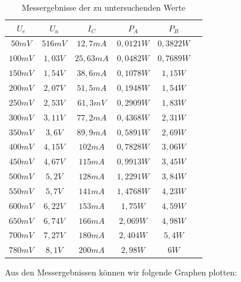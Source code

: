 \documentclass{article}
\begin{document}
\begin{table}[h]
  \centering
  \begin{tabular}{|c|c|c|c|c|c|}
    $U_{e}$& $U_{a}$ & $I_{C}$&$P_{A}$&$P_{B}$\\
    \hline
    $50mV$ & $516mV$ & $12,7mA$ & $0,0121W$ & $0,3822W$\\
    \hline
    $100mV$ & $1,03V$ & $25,63mA$ & $0,0482W$ & $0,7689W$\\
    \hline
    $150mV$ & $1,54V$ & $38,6mA$ & $0,1078W$ & $1,15W$\\
    \hline
    $200mV$ & $2,07V$ & $51,5mA$ & $0,1948W$ & $1,54W$\\
    \hline
    $250mV$ & $2,53V$ & $61,3mV$ & $0,2909W$ & $1,83W$\\
    \hline
    $300mV$ & $3,11V$ & $77,2mA$ & $0,4368W$ & $2,31W$\\
    \hline
    $350mV$ & $3,6V$ & $89,9mA$ & $0,5891W$ & $2,69W$\\
    \hline
    $400mV$ & $4,15V$ & $102mA$ & $0,7828W$ & $3,06W$\\
    \hline
    $450mV$& $4,67V$ & $115mA$ & $0,9913W$ & $3,45W$\\
    \hline
    $500mV$ & $5,2V$ & $128mA$ & $1,2291W$ & $3,84W$\\
    \hline
    $550mV$ & $5,7V$ & $141mA$ & $1,4768W$ & $4,23W$\\
    \hline
    $600mV$ & $6,22V$ & $153mA$ & $1,75W$ & $4,59W$\\
    \hline
    $650mV$ & $6,74V$ & $166mA$ & $2,069W$ & $4,98W$\\
    \hline
    $700mV$ & $7,27V$ & $180mA$ & $2,404W$ & $5,4W$\\
    \hline
    $780mV$ & $8,1V$ & $200mA$ &  $2,98W$ & $6W$\\
    \hline
  \end{tabular}
  \caption{Messergebnisse der zu untersuchenden Werte}
  \label{tab:messungauf3}
\end{table}

Aus den Messergebnissen können wir folgende Graphen plotten:
\end{document}
